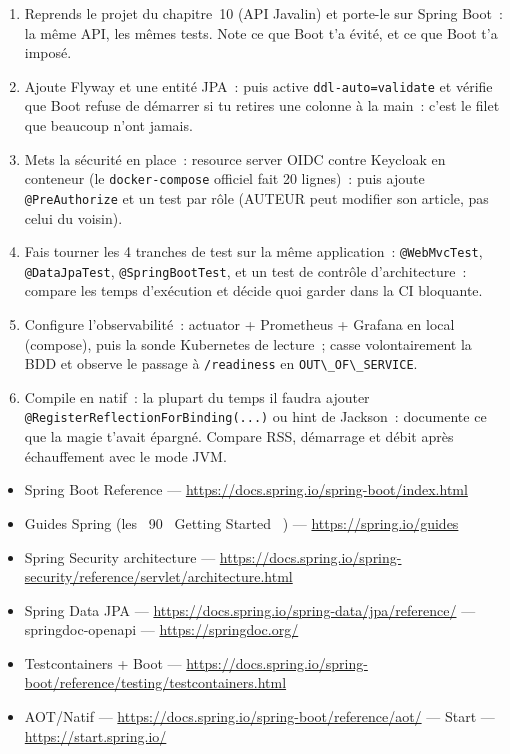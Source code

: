 \documentclass[12pt,a4paper,twoside,openright]{book}
\begin{document}
\begin{exercice}
\begin{enumerate}
  \item Reprends le projet du chapitre~10 (API Javalin) et porte-le sur Spring Boot~: la m\^eme API,
        les m\^emes tests. Note ce que Boot t'a \'evit\'e, et ce que Boot t'a impos\'e.
  \item Ajoute Flyway et une entit\'e JPA~: puis active \verb|ddl-auto=validate| et v\'erifie que Boot
        refuse de d\'emarrer si tu retires une colonne \`a la main~: c'est le filet que beaucoup n'ont jamais.
  \item Mets la s\'ecurit\'e en place~: resource server OIDC contre Keycloak en conteneur (le
        \verb|docker-compose| officiel fait 20 lignes)~: puis ajoute \verb|@PreAuthorize| et un test
        par r\^ole (AUTEUR peut modifier son article, pas celui du voisin).
  \item Fais tourner les 4 tranches de test sur la m\^eme application~: \verb|@WebMvcTest|,
        \verb|@DataJpaTest|, \verb|@SpringBootTest|, et un test de contr\^ole d'architecture~: compare
        les temps d'ex\'ecution et d\'ecide quoi garder dans la CI bloquante.
  \item Configure l'observabilit\'e~: actuator + Prometheus + Grafana en local (compose), puis la
        sonde Kubernetes de lecture~; casse volontairement la BDD et observe le passage \`a
        \verb|/readiness| en \verb|OUT\_OF\_SERVICE|.
  \item Compile en natif~: la plupart du temps il faudra ajouter
        \verb|@RegisterReflectionForBinding(...)| ou hint de Jackson~: documente ce que la magie
        t'avait \'epargn\'e. Compare RSS, d\'emarrage et d\'ebit apr\`es \'echauffement avec le mode JVM.
\end{enumerate}
\end{exercice}

\begin{ressources}
\begin{itemize}
  \item Spring Boot Reference --- \url{https://docs.spring.io/spring-boot/index.html}
  \item Guides Spring (les ~90 \og ~Getting Started~ \fg{}) --- \url{https://spring.io/guides}
  \item Spring Security architecture --- \url{https://docs.spring.io/spring-security/reference/servlet/architecture.html}
  \item Spring Data JPA --- \url{https://docs.spring.io/spring-data/jpa/reference/} --- springdoc-openapi --- \url{https://springdoc.org/}
  \item Testcontainers + Boot --- \url{https://docs.spring.io/spring-boot/reference/testing/testcontainers.html}
  \item AOT/Natif --- \url{https://docs.spring.io/spring-boot/reference/aot/} --- Start --- \url{https://start.spring.io/}
\end{itemize}
\end{ressources}
\end{document}
